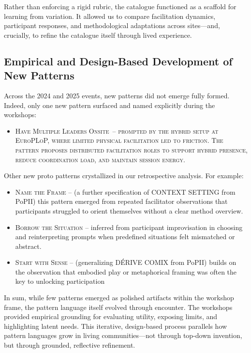 \documentclass[acmlarge,timestamp]{acmart}
\providecommand{\tightlist}{%
  \setlength{\itemsep}{0pt}\setlength{\parskip}{0pt}}
\begin{document}
Rather than enforcing a rigid rubric, the catalogue functioned as a
scaffold for learning from variation. It allowed us to compare
facilitation dynamics, participant responses, and methodological
adaptations across sites---and, crucially, to refine the catalogue
itself through lived experience.

\subsection{Empirical and Design-Based Development of New Patterns}

Across the 2024 and 2025 events, new patterns did not emerge fully
formed.  Indeed, only one new pattern surfaced and named explicitly
during the workshops:

\begin{itemize}
\tightlist
\item[]
  \scshape{Have Multiple Leaders Onsite}{~-- prompted by the hybrid setup at
  EuroPLoP, where limited physical facilitation led to friction. The
  pattern proposes distributed facilitation roles to support hybrid
  presence, reduce coordination load, and maintain session energy.}
\end{itemize}

Other new proto patterns crystallized in our retrospective analysis.
For example:

\begin{itemize}
\tightlist
\item[]
  {\scshape{Name the Frame}} -- (a further specification of
  CONTEXT SETTING from PoPII) this pattern emerged from repeated
  facilitator observations that participants struggled to orient
  themselves without a clear method overview.
\item[]
  {\scshape{Borrow the Situation}} -- inferred from participant improvisation in choosing and reinterpreting prompts when predefined situations felt mismatched or abstract.
\item[]
  {\scshape{Start with Sense}} -- (generalizing {D\'ERIVE COMIX} from PoPII)
    builds on the observation that embodied play or metaphorical
    framing was often the key to unlocking participation
\end{itemize}

{In sum, while few patterns emerged as polished artifacts within the
workshop frame, the pattern language itself evolved through encounter.
The workshops provided empirical grounding for evaluating utility,
exposing limits, and highlighting latent needs. This iterative,
design-based process parallels how pattern languages grow in living
communities---not through top-down invention, but through grounded,
reflective refinement.}
\end{document}

